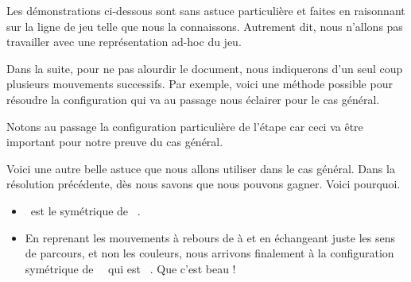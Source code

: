 Les démonstrations ci-dessous sont sans astuce particulière et faites en raisonnant sur la ligne de jeu telle que nous la connaissons. Autrement dit, nous n'allons pas travailler avec une représentation ad-hoc du jeu.


\begin{remark}
	Dans la suite, pour ne pas alourdir le document, nous indiquerons d'un seul coup plusieurs mouvements successifs.
	Par exemple, voici une méthode possible pour résoudre la configuration  qui va au passage nous éclairer pour le cas général.
	\begin{mvts}
		\medskip
		\item  {}

		\medskip
		\item  {}

		\medskip
		\item  {}

		\medskip
		\item  {}

		\medskip
		\item  {}

		\medskip
		\item  {}

		\medskip
		\item  {}

		\medskip
		\item  {}
	\end{mvts}

	Notons au passage la configuration particulière de l'étape  car ceci va être important pour notre preuve du cas général. 
\end{remark}


\begin{remark}
	Voici une autre belle astuce que nous allons utiliser dans le cas général. Dans la résolution précédente, dès  nous savons que nous pouvons gagner. Voici pourquoi.
	\begin{itemize}[label=\small\textbullet]
		\item {} \, est le symétrique de \,  .

		\item En reprenant les mouvements à rebours de  à  et en échangeant juste les sens de parcours, et non les couleurs, nous arrivons finalement à la configuration symétrique de  \,  \, qui est \,  . Que c'est beau !
	\end{itemize}
\end{remark}



